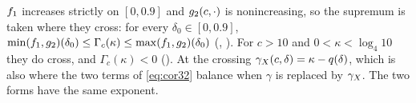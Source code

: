 \begin{remark}\label{rem:same-exponent}
\(f_{1}\) increases strictly on \([0,0.9]\) and \(g_{2}(c,\cdot)\) is
nonincreasing, so the supremum is taken where they cross: for every
\(\delta_0\in[0,0.9]\),
\(\min(f_{1},g_{2})(\delta_0)\le\Gamma_c(\kappa)\le\max(f_{1},g_{2})(\delta_0)\)
(, ).  For \(c>10\) and
\(0<\kappa<\log_4 10\) they do cross, and \(\Gamma_c(\kappa)<0\)
().  At the crossing
\(\gamma_{X}(c,\delta)=\kappa-q(\delta)\), which is also where the two terms of
\eqref{eq:cor32} balance when \(\gamma\) is replaced by \(\gamma_{X}\).  The two forms
have the same exponent.
\end{remark}
